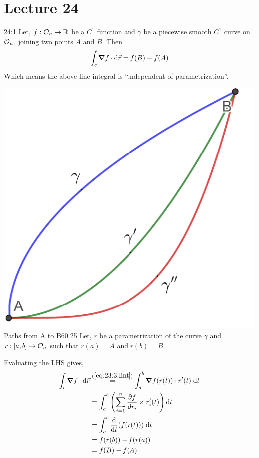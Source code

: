\documentclass[../Analysis-3.tex]{subfiles}
\begin{document}
\chapter*{Lecture 24} %
\setcounter{chapter}{24} %
\setcounter{section}{0}
\setcounter{equation}{0}
\setcounter{figure}{0}


\begin{Thm}{}{24:1}
  Let, $f: \mathcal{O}_{n} \to \mathbb{R}$ be a $C^1$ function and $\gamma$ be a piecewise smooth $C^1$ curve on $\mathcal{O}_{n}$, joining two points $A$ and $B$. Then
  \[\int_c \grad f\cdot \dd\vec{r} = f(B)-f(A)\]
  Which means the above line integral is ``independent of parametrization''.
\end{Thm}


\begin{proofFig}{\includegraphics[width=.78\linewidth]{../figures/lec-24.1.png}}{Paths from A to B}{\label{path:AtoB}}{6}{0.25\textwidth}
  Let, $r$ be a parametrization of the curve $\gamma$ and $r :[a,b] \to \mathcal{O}_{n}$ such that $r(a)=A$ and $r(b)=B$.

  Evaluating the LHS gives,
  \begin{align*}
    \int_c \grad f\cdot \dd\vec{r}
     & \overset{(\ref{eq:23:3:lint})}{=} \int_a^b \grad f(r(t)) \cdot r'(t) \; \dd t \\
     & = \int_a^b \left(\sum_{i=1}^{n} \pdv{f}{r_i}\times r_i'(t) \right) \dd t      \\
     & =\int_a^b \dv{t}(f(r(t))) \; \dd t                                            \\
     & = f(r(b)) - f(r(a))                                                           \\
     & = f(B) - f(A)
  \end{align*}
\end{proofFig}
\end{document}
